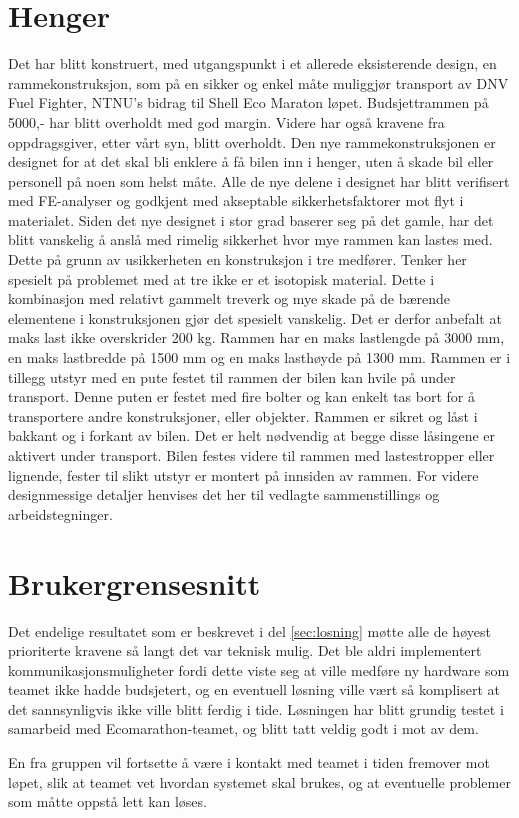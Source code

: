 \section{Henger}
Det har blitt konstruert, med utgangspunkt i et allerede eksisterende design, en rammekonstruksjon, som på en sikker og enkel måte muliggjør transport av DNV Fuel Fighter, NTNU’s bidrag til Shell Eco Maraton løpet. Budsjettrammen på 5000,- har blitt overholdt med god margin. Videre har også kravene fra oppdragsgiver, etter vårt syn, blitt overholdt. Den nye rammekonstruksjonen er designet for at det skal bli enklere å få bilen inn i henger, uten å skade bil eller personell på noen som helst måte. 
Alle de nye delene i designet har blitt verifisert med FE-analyser og godkjent med akseptable sikkerhetsfaktorer mot flyt i materialet. 
Siden det nye designet i stor grad baserer seg på det gamle, har det blitt vanskelig å anslå med rimelig sikkerhet hvor mye rammen kan lastes med. Dette på grunn av usikkerheten en konstruksjon i tre medfører. Tenker her spesielt på problemet med at tre ikke er et isotopisk material. Dette i kombinasjon med relativt gammelt treverk og mye skade på de bærende elementene i konstruksjonen gjør det spesielt vanskelig. Det er derfor anbefalt at maks last ikke overskrider 200 kg. Rammen har en maks lastlengde på 3000 mm, en maks lastbredde på 1500 mm og en maks lasthøyde på 1300 mm. 
Rammen er i tillegg utstyr med en pute festet til rammen der bilen kan hvile på under transport. Denne puten er festet med fire bolter og kan enkelt tas bort for å transportere andre konstruksjoner, eller objekter. 
Rammen er sikret og låst i bakkant og i forkant av bilen. Det er helt nødvendig at begge disse låsingene er aktivert under transport. Bilen festes videre til rammen med lastestropper eller lignende, fester til slikt utstyr er montert på innsiden av rammen. For videre designmessige detaljer henvises det her til vedlagte sammenstillings og arbeidstegninger.
\section{Brukergrensesnitt}
Det endelige resultatet som er beskrevet i del \ref{sec:losning} møtte alle de høyest prioriterte kravene så langt det var teknisk mulig.
Det ble aldri implementert kommunikasjonsmuligheter fordi dette viste seg at ville medføre ny hardware som teamet ikke hadde budsjetert, og en eventuell løsning ville vært så komplisert at det sannsynligvis ikke ville blitt ferdig i tide.
Løsningen har blitt grundig testet i samarbeid med Ecomarathon-teamet, og blitt tatt veldig godt i mot av dem.

En fra gruppen vil fortsette å være i kontakt med teamet i tiden fremover mot løpet, slik at teamet vet hvordan systemet skal brukes, og at eventuelle problemer som måtte oppstå lett kan løses.
